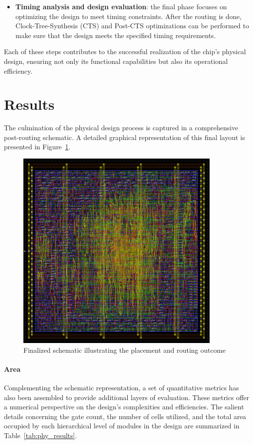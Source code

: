 \begin{itemize}
	\item \textbf{Timing analysis and design evaluation}: the final phase focuses on optimizing the design to meet timing constraints. After the routing is done, Clock-Tree-Synthesis (CTS) and Post-CTS optimizations can be performed to make sure that the design meets the specified timing requirements.
\end{itemize}

Each of these steps contributes to the successful realization of the chip's physical design, ensuring not only its functional capabilities but also its operational efficiency.

\section{Results}
The culmination of the physical design process is captured in a comprehensive post-routing schematic. A detailed graphical representation of this final layout is presented in Figure~\ref{fig:physical_dlx}. \\

\begin{figure}[!htbp]
    \centering
    \includegraphics[width=0.9\textwidth]{source/figures/physical_dlx.png}
    \caption{Finalized schematic illustrating the placement and routing outcome}
    \label{fig:physical_dlx}
\end{figure}

\paragraph{Area}
Complementing the schematic representation, a set of quantitative metrics has also been assembled to provide additional layers of evaluation. These metrics offer a numerical perspective on the design's complexities and efficiencies. The salient details concerning the gate count, the number of cells utilized, and the total area occupied by each hierarchical level of modules in the design are summarized in Table~\ref{tab:phy_results}. \\

